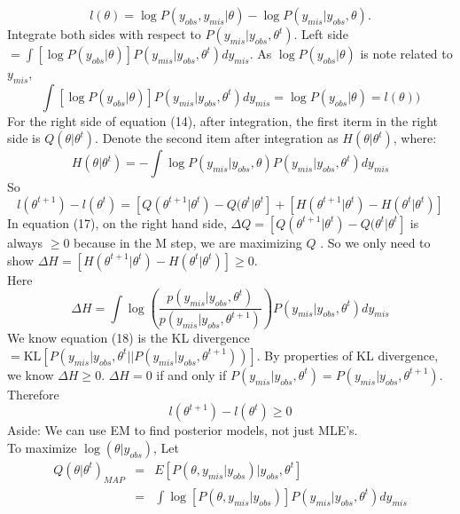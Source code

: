 \documentclass[a4paper]{article}
\begin{document}
\begin{equation}
 l(\theta) = \log{P(y_{obs}, y_{mis}\vert \theta)}-\log{P(y_{mis} \vert y_{obs}, \theta)}.
\end{equation}
Integrate both sides with respect to $P(y_{mis} \vert y_{obs}, \theta ^{t})$. 
Left side $= \int[\log {P(y_{obs} | \theta )}] P(y_{mis}\vert y_{obs}, {\theta}^{t})dy_{mis}$. As $\log {P(y_{obs} | \theta )}$ is note related to $y_{mis}$, 
\begin{equation} 
 \int[\log {P(y_{obs} | \theta )}] P(y_{mis}\vert y_{obs}, {\theta}^{t})dy_{mis} = \log{P(y_{obs}\vert \theta)} = l(\theta)) 
\end{equation}
For the right side of equation (14), after integration, the first iterm in the right side is $Q(\theta | \theta^{t})$. Denote the second item after integration as $H(\theta | \theta ^{t})$, where:
\begin{equation} 
H(\theta \vert \theta ^{t}) = - \int \log{P(y_{mis} \vert y_{obs}, \theta)} P(y_{mis} \vert y_{obs}, \theta ^{t})dy_{mis}
\end{equation}
So 
\begin{equation} 
l(\theta ^{t+1}) - l(\theta^{t}) = \left [Q(\theta^{t+1} \vert \theta^{t}) -Q(\theta^{t} \vert \theta^{t} \right] + \left [H(\theta^{t+1} \vert \theta ^{t}) - H(\theta^{t} \vert \theta ^{t})\right ] 
\end{equation}
In equation (17), on the right hand side, $\Delta Q = \left [Q(\theta^{t+1} \vert \theta^{t}) -Q(\theta^{t} \vert \theta^{t} \right]  $ is always $\ge 0$ because in the M step, we are maximizing $Q$ . So we only need to show $\Delta H =\left [H(\theta^{t+1} \vert \theta ^{t}) - H(\theta^{t} \vert \theta ^{t})\right ] \ge 0$.\\
Here 
\begin{equation} 
\Delta H =\int \log\left (\frac{p(y_{mis} \vert y_{obs}, \theta^{t})}{p(y_{mis} \vert y_{obs}, \theta^{t+1})}\right)P(y_{mis} \vert y_{obs}, \theta ^{t})dy_{mis}
\end{equation}
We know equation (18) is the KL divergence $ = \text{KL} \left[P(y_{mis} \vert y_{obs}, \theta^{t} || P(y_{mis} \vert y_{obs}, \theta^{t+1}))\right]$. By properties of KL divergence, we know $\Delta H \ge 0$. $\Delta H  = 0$ if and only if $P(y_{mis} | y_{obs}, \theta ^{t}) =P(y_{mis} | y_{obs}, \theta ^{t+1})$.\\ Therefore\\
\begin{equation} 
l(\theta ^{t+1}) - l(\theta ^{t}) \ge 0
\end{equation}
Aside: We can use EM to find posterior models, not just MLE's. \\
To maximize $\log (\theta \vert y_{obs})$, Let \\
\begin{eqnarray}
Q(\theta \vert \theta^{t})_{MAP} &=& E\left [ P(\theta, y_{mis}\vert y_{obs}) \vert y_{obs}, \theta ^{t}\right ]\\
&=& \int \log\left [P(\theta, y_{mis} \vert y_{obs})\right ] P(y_{mis} \vert y_{obs}, \theta^{t})dy_{mis}
\end{eqnarray}
\end{document}
